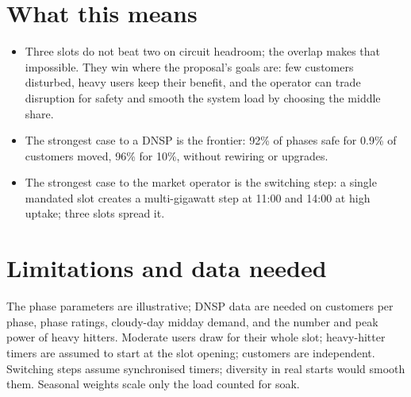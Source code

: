\documentclass[11pt,a4paper]{article}
\begin{document}
\section{What this means}
\begin{itemize}\itemsep0pt
\item Three slots do not beat two on circuit headroom; the overlap makes that impossible. They win where
  the proposal's goals are: few customers disturbed, heavy users keep their benefit, and the operator can
  trade disruption for safety and smooth the system load by choosing the middle share.
\item The strongest case to a DNSP is the frontier: 92\% of phases safe for 0.9\% of customers moved,
  96\% for 10\%, without rewiring or upgrades.
\item The strongest case to the market operator is the switching step: a single mandated slot creates a
  multi-gigawatt step at 11:00 and 14:00 at high uptake; three slots spread it.
\end{itemize}

\section{Limitations and data needed}
The phase parameters are illustrative; DNSP data are needed on customers per phase, phase ratings,
cloudy-day midday demand, and the number and peak power of heavy hitters. Moderate users draw for their
whole slot; heavy-hitter timers are assumed to start at the slot opening; customers are independent.
Switching steps assume synchronised timers; diversity in real starts would smooth them. Seasonal weights
scale only the load counted for soak.
\end{document}

